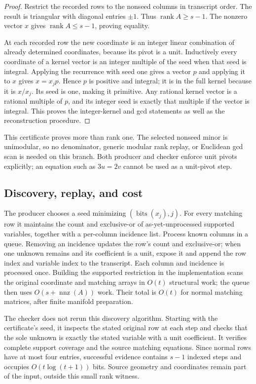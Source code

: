 \documentclass[11pt,a4paper]{article}
\theoremstyle{definition}
\newcommand{\rank}{\operatorname{rank}}
\newcommand{\bits}{\operatorname{bits}}
\newcommand{\nnz}{\operatorname{nnz}}
\begin{document}
\begin{proof}
Restrict the recorded rows to the nonseed columns in transcript order.  The
result is triangular with diagonal entries $\pm1$.  Thus $\rank A\ge s-1$.
The nonzero vector $x$ gives $\rank A\le s-1$, proving equality.

At each recorded row the new coordinate is an integer linear combination of
already determined coordinates, because its pivot is a unit.  Inductively
every coordinate of a kernel vector is an integer multiple of the seed when
that seed is integral.  Applying the recurrence with seed one gives a vector
$p$ and applying it to $x$ gives $x=x_jp$.  Hence $p$ is positive and integral;
it is in the full kernel because it is $x/x_j$.  Its seed is one, making it
primitive.  Any rational kernel vector is a rational multiple of $p$, and its
integer seed is exactly that multiple if the vector is integral.  This proves
the integer-kernel and gcd statements as well as the reconstruction procedure.
\end{proof}

This certificate proves more than rank one.  The selected nonseed minor is
unimodular, so no denominator, generic modular rank replay, or Euclidean gcd
scan is needed on this branch.  Both producer and checker enforce unit pivots
explicitly; an equation such as $3u=2v$ cannot be used as a unit-pivot step.

\subsection{Discovery, replay, and cost}

The producer chooses a seed minimizing $(\bits(x_j),j)$.  For every matching
row it maintains the count and exclusive-or of as-yet-unprocessed supported
variables, together with a per-column incidence list.  Process known columns
in a queue.  Removing an incidence updates the row's count and exclusive-or;
when one unknown remains and its coefficient is a unit, expose it and append
the row index and variable index to the transcript.  Each column and incidence
is processed once.  Building the supported restriction in the implementation
scans the original coordinate and matching arrays in $O(t)$ structural work;
the queue then uses $O(s+\nnz(A))$ work.  Their total is $O(t)$ for normal
matching matrices, after finite manifold preparation.

The checker does not rerun this discovery algorithm.  Starting with the
certificate's seed, it inspects the stated original row at each step and
checks that the sole unknown is exactly the stated variable with a unit
coefficient.  It verifies complete support coverage and the source matching
equations.  Since normal rows have at most four entries, successful evidence
contains $s-1$ indexed steps and occupies $O(t\log(t+1))$ bits.  Source geometry
and coordinates remain part of the input, outside this small rank witness.
\end{document}
